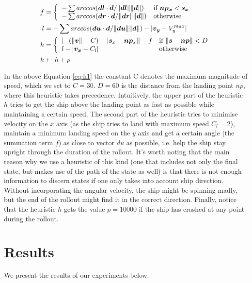 \documentclass[conference]{IEEEtran}
\newcommand{\abs}[1]{\lvert#1\rvert}
\newcommand{\norm}[1]{\lVert#1\rVert}
\newcommand{\twopartdef}[4]
{
	\left\{
		\begin{array}{ll}
			#1 & \mbox{if } #2 \\
			#3 & \mbox{otherwise } 
		\end{array}
	\right.
}
\begin{document}
\begin{align}
f &= \twopartdef{-\sum{arccos(\bm{dl}\cdot\bm{d}/\norm{\bm{dl}}\norm{\bm{d}}})}{\bm{np_x} < \bm{s_x}}{-\sum{arccos(\bm{dr}\cdot\bm{d}/\norm{\bm{dr}}\norm{\bm{d}}})} {otherwise}\notag\\
l &= -\sum{arccos(\bm{du}\cdot\bm{d}/\norm{\bm{du}}\norm{\bm{d}}}) - \abs{\bm {v_y} - V_{y}^{max}}\notag\\
h &= \twopartdef{ \abs{-(\norm{\bm {v}} - C) - \abs{\bm {s}_{x} - \bm {np}_{x}}} - f}{\norm{\bm {s} - \bm {np}} < D}
{l - \abs{\bm {v_x} -C_l }  }{Otherwise}\notag\\
h&\gets h + p 
\label{eq:h1}
\end{align}

In the above Equation \ref{eq:h1} the constant C denotes the maximum magnitude of speed, which we set to $C=30$. $D = 60$ is the distance from the landing point $np$, where this heuristic takes precedence.  Intuitively, the upper part of the heuristic $h$ tries to get the ship above the landing point as fast as possible while maintaining a certain speed. The second part of the heuristic tries to minimise velocity on the $x$ axis (as the ship tries to land with maximum speed $C_l = 2$), maintain a minimum landing speed on the $y$ axis and get a certain angle (the summation term $f$) as close to vector $du$ as possible, i.e. help the ship stay upright through the duration of the rollout.  It's worth noting that the main reason why we use a heuristic of this kind (one that includes not only the final state, but makes use of the path of the state as well) is that there is not enough information to discern states if one only takes into account ship direction.  Without incorporating the angular velocity,  the ship might be spinning madly, but the end of the rollout might find it in the correct direction. Finally, notice that the heuristic $h$ gets the value $p=10000$ if the ship has crashed at any point during the rollout.   

\section{Results} \label{sec:Experiments}
We present the results of our experiments below.







\end{document}
